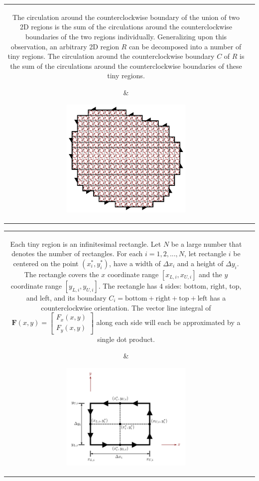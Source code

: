 \documentclass{article}
\begin{document}
\begin{tabular}{cc}
\parbox{0.5\textwidth}{
The circulation around the counterclockwise boundary of the union of two 2D regions is the sum of the circulations around the counterclockwise boundaries of the two regions individually. Generalizing upon this observation, an arbitrary 2D region \(R\) can be decomposed into a number of tiny regions. The circulation around the counterclockwise boundary \(C\) of \(R\) is the sum of the circulations around the counterclockwise boundaries of these tiny regions. 
} & \parbox{0.5\textwidth}{
\includegraphics[width = 0.5\textwidth]{2D_loop_decomposition_x}
}
\end{tabular}

\begin{tabular}{cc}
\parbox{0.5\textwidth}{
Each tiny region is an infinitesimal rectangle. Let \(N\) be a large number that denotes the number of rectangles. For each \(i = 1, 2, ..., N\), let rectangle \(i\) be centered on the point \((x_i^*, y_i^*)\), have a width of \(\Delta x_i\) and a height of \(\Delta y_i\).  The rectangle covers the \(x\) coordinate range \([x_{L,i}, x_{U,i}]\) and the \(y\) coordinate range \([y_{L,i}, y_{U,i}]\). The rectangle has \(4\) sides: bottom, right, top, and left, and its boundary \(C_i = \text{bottom} + \text{right} + \text{top} + \text{left}\) has a counterclockwise orientation. The vector line integral of \(\mathbf{F}(x,y) = \begin{bmatrix} F_x(x,y) \\ F_y(x,y) \end{bmatrix}\) along each side will each be approximated by a single dot product. 
} & \parbox{0.5\textwidth}{
\includegraphics[width = 0.5\textwidth]{infinitesimal_rectangle}
}
\end{tabular}
\end{document}
